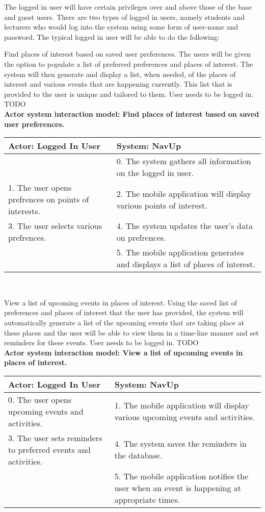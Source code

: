 The logged in user will have certain privileges over and above those of the base and guest users. There are two types of logged in users, namely students and lecturers who would log into the system using some form of user-name and password. The typical logged in user will be able to do the following:

\FuncReq
{Find places of interest based on saved user preferences.}
{The users will be given the option to populate a list of preferred preferences and places of interest. The system will then generate and display a list, when needed, of the  places of interest and various events that are happening currently. This list that is provided to the user is unique and tailored to them.}
{User needs to be logged in.}
{TODO}
\\
    \textbf{Actor system interaction model: Find places of interest based on saved user preferences. }\\
    \begin{tabular}{ | p{6cm} | p{6cm} |}
    \hline
    Actor: Logged In User & System: NavUp \\ \hline
    & 0. The system gathers all information on the logged in user.\\ \hline
    1. The user opens prefrences on points of interests. & 2. The mobile application will display various points of interest.\\ \hline
    3. The user selects various prefrences. & 4. The system updates the user's data on prefrences. \\ \hline
    & 5. The mobile application generates and displays a list of places of interest. \\ \hline
    \end{tabular}
\\
\bigskip

\FuncReq
{View a list of upcoming events in places of interest.}
{Using the saved list of preferences and places of interest that the user has provided, the system will automatically generate a list of the upcoming events that are taking place at these places and the user will be able to view them in a time-line manner and set reminders for these events.}
{User needs to be logged in.}
{TODO}
\\
    \textbf{Actor system interaction model: View a list of upcoming events in places of interest. }\\
    \begin{tabular}{ | p{6cm} | p{6cm} |}
    \hline
    Actor: Logged In User & System: NavUp \\ \hline
    0. The user opens upcoming events and activities. & 1. The mobile application will display various upcoming events and activities.\\ \hline
    3. The user sets reminders to preferred events and activities. & 4. The system saves the reminders in the database. \\ \hline
    & 5. The mobile application notifies the user when an event is happening at appropriate times. \\ \hline
    \end{tabular}
\\
\bigskip

